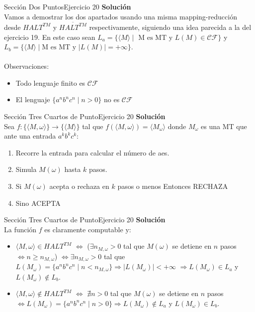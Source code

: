 \documentclass[10pt, envcountsect, presentation, aspectratio=169]{beamer}
\begin{document}
\begin{frame}{Sección Dos Puntos}{Ejercicio 20}
    \textbf{Solución}\\
    Vamos a demostrar los dos apartados usando una misma mapping-reducción desde $HALT^{TM}$ y $\overline{HALT^{TM}}$ respectivamente, siguiendo una idea parecida a la del ejercicio 19.
    En este caso sean $L_a = \{\langle M \rangle \mid \text{ M es MT y } L(M) \in \mathcal{CF}\}$ y $L_b = \{\langle M \rangle \mid \text{M es MT y } |L(M)|=+\infty\}$.\\~\\

    Observaciones:
    \begin{itemize}
        \item Todo lenguaje finito es $\mathcal{CF}$
        \item El lenguaje $\{a^n b^n c^n \mid n > 0\}$ no es $\mathcal{CF}$
    \end{itemize}
\end{frame}


\begin{frame}{Sección Tres Cuartos de Punto}{Ejercicio 20}
    \textbf{Solución}\\
    Sea $f: \{\langle M, \omega \rangle\} \rightarrow \{\langle M \rangle \}$ tal que $f(\langle M, \omega \rangle) = \langle M_{\omega} \rangle$ donde $M_{\omega}$ es una MT que ante una entrada $a^k b^k c^k$:
    \begin{enumerate}
        \item Recorre la entrada para calcular el número de aes.
        \item Simula $M(\omega)$ hasta $k$ pasos.
        \item Si $M(\omega)$ acepta o rechaza en $k$ pasos o menos Entonces RECHAZA
        \item Sino ACEPTA
    \end{enumerate}
\end{frame}


\begin{frame}{Sección Tres Cuartos de Punto}{Ejercicio 20}
    \textbf{Solución}\\
    La función $f$ es claramente computable y:
    \begin{itemize}
        \item $\langle M, \omega \rangle \in HALT^{TM}$ $\Leftrightarrow$  ($\exists n_{M,\omega} > 0$ tal que $M(\omega)$ se detiene en $n$ pasos $\Leftrightarrow n \geq n_{M,\omega}$) $\Leftrightarrow \exists n_{M,\omega} > 0$ tal que $L(M_{\omega}) = \{a^n b^n c^n \mid n < n_{M,\omega}\} \Rightarrow |L(M_{\omega})| < + \infty$ $\Rightarrow L(M_{\omega}) \in L_a$ y $L(M_\omega) \notin L_b$.
        \item $\langle M, \omega \rangle \notin HALT^{TM}$ $\Leftrightarrow$  $\nexists n > 0$ tal que $M(\omega)$ se detiene en $n$ pasos $\Leftrightarrow L(M_{\omega}) = \{a^n b^n c^n \mid n > 0\} \Rightarrow L(M_{\omega}) \notin L_a$ y $L(M_\omega) \in L_b$.
    \end{itemize}
\end{frame}
\end{document}
